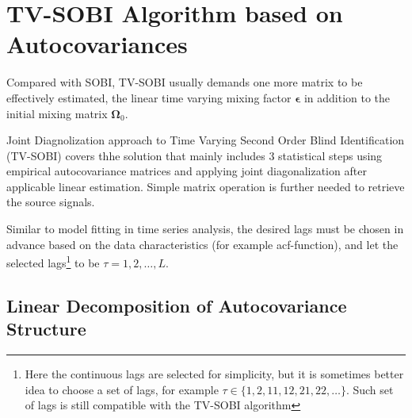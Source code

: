 \documentclass[utf8,english]{gradu3}
\begin{document}
\chapter{TV-SOBI Algorithm based on Autocovariances}

Compared with SOBI, TV-SOBI usually demands one more matrix to be effectively estimated, the linear time varying mixing factor $\boldsymbol{\epsilon}$ in addition to the initial mixing matrix $\boldsymbol{\Omega}_0$.

Joint Diagnolization approach to Time Varying Second Order Blind Identification (TV-SOBI) covers thhe solution that mainly includes 3 statistical steps using empirical autocovariance matrices and applying joint diagonalization after applicable linear estimation. Simple matrix operation is further needed to retrieve the source signals.

Similar to model fitting in time series analysis, the desired lags must be chosen in advance based on the data characteristics (for example acf-function), and let the selected lags\footnote{Here the continuous lags are selected for simplicity, but it is sometimes better idea to choose a set of lags, for example $\tau\in\{1,2,11,12,21,22,\dots\}$. Such set of lags is still compatible with the TV-SOBI algorithm} to be $\tau=1,2,\dots,L$.

\section{Linear Decomposition of Autocovariance Structure}
\end{document}
